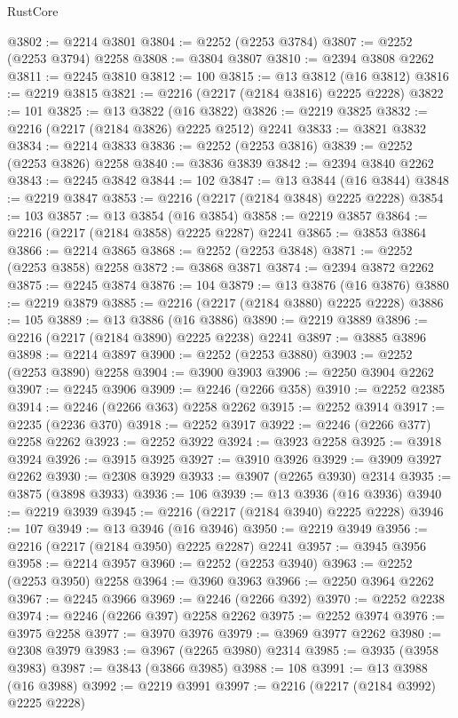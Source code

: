 \begin{lexlean}{RustCore}
\begin{coremodule}
@3802 := @2214 @3801
@3804 := @2252 (@2253 @3784)
@3807 := @2252 (@2253 @3794) @2258
@3808 := @3804 @3807
@3810 := @2394 @3808 @2262
@3811 := @2245 @3810
@3812 := 100
@3815 := @13 @3812 (@16 @3812)
@3816 := @2219 @3815
@3821 := @2216 (@2217 (@2184 @3816) @2225 @2228)
@3822 := 101
@3825 := @13 @3822 (@16 @3822)
@3826 := @2219 @3825
@3832 := @2216 (@2217 (@2184 @3826) @2225 @2512) @2241
@3833 := @3821 @3832
@3834 := @2214 @3833
@3836 := @2252 (@2253 @3816)
@3839 := @2252 (@2253 @3826) @2258
@3840 := @3836 @3839
@3842 := @2394 @3840 @2262
@3843 := @2245 @3842
@3844 := 102
@3847 := @13 @3844 (@16 @3844)
@3848 := @2219 @3847
@3853 := @2216 (@2217 (@2184 @3848) @2225 @2228)
@3854 := 103
@3857 := @13 @3854 (@16 @3854)
@3858 := @2219 @3857
@3864 := @2216 (@2217 (@2184 @3858) @2225 @2287) @2241
@3865 := @3853 @3864
@3866 := @2214 @3865
@3868 := @2252 (@2253 @3848)
@3871 := @2252 (@2253 @3858) @2258
@3872 := @3868 @3871
@3874 := @2394 @3872 @2262
@3875 := @2245 @3874
@3876 := 104
@3879 := @13 @3876 (@16 @3876)
@3880 := @2219 @3879
@3885 := @2216 (@2217 (@2184 @3880) @2225 @2228)
@3886 := 105
@3889 := @13 @3886 (@16 @3886)
@3890 := @2219 @3889
@3896 := @2216 (@2217 (@2184 @3890) @2225 @2238) @2241
@3897 := @3885 @3896
@3898 := @2214 @3897
@3900 := @2252 (@2253 @3880)
@3903 := @2252 (@2253 @3890) @2258
@3904 := @3900 @3903
@3906 := @2250 @3904 @2262
@3907 := @2245 @3906
@3909 := @2246 (@2266 @358)
@3910 := @2252 @2385
@3914 := @2246 (@2266 @363) @2258 @2262
@3915 := @2252 @3914
@3917 := @2235 (@2236 @370)
@3918 := @2252 @3917
@3922 := @2246 (@2266 @377) @2258 @2262
@3923 := @2252 @3922
@3924 := @3923 @2258
@3925 := @3918 @3924
@3926 := @3915 @3925
@3927 := @3910 @3926
@3929 := @3909 @3927 @2262
@3930 := @2308 @3929
@3933 := @3907 (@2265 @3930) @2314
@3935 := @3875 (@3898 @3933)
@3936 := 106
@3939 := @13 @3936 (@16 @3936)
@3940 := @2219 @3939
@3945 := @2216 (@2217 (@2184 @3940) @2225 @2228)
@3946 := 107
@3949 := @13 @3946 (@16 @3946)
@3950 := @2219 @3949
@3956 := @2216 (@2217 (@2184 @3950) @2225 @2287) @2241
@3957 := @3945 @3956
@3958 := @2214 @3957
@3960 := @2252 (@2253 @3940)
@3963 := @2252 (@2253 @3950) @2258
@3964 := @3960 @3963
@3966 := @2250 @3964 @2262
@3967 := @2245 @3966
@3969 := @2246 (@2266 @392)
@3970 := @2252 @2238
@3974 := @2246 (@2266 @397) @2258 @2262
@3975 := @2252 @3974
@3976 := @3975 @2258
@3977 := @3970 @3976
@3979 := @3969 @3977 @2262
@3980 := @2308 @3979
@3983 := @3967 (@2265 @3980) @2314
@3985 := @3935 (@3958 @3983)
@3987 := @3843 (@3866 @3985)
@3988 := 108
@3991 := @13 @3988 (@16 @3988)
@3992 := @2219 @3991
@3997 := @2216 (@2217 (@2184 @3992) @2225 @2228)

\end{coremodule}
\end{lexlean}
